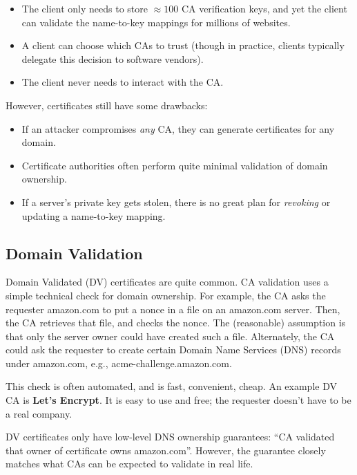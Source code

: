 \documentclass[
  letterpaper,
]{scrbook}
\providecommand{\tightlist}{%
  \setlength{\itemsep}{0pt}\setlength{\parskip}{0pt}}
\theoremstyle{definition}
\theoremstyle{plain}
\theoremstyle{plain}
\theoremstyle{remark}
\begin{document}
\begin{itemize}
\tightlist
\item
  The client only needs to store \(\approx 100\) CA verification keys,
  and yet the client can validate the name-to-key mappings for millions
  of websites.
\item
  A client can choose which CAs to trust (though in practice, clients
  typically delegate this decision to software vendors).
\item
  The client never needs to interact with the CA.
\end{itemize}

However, certificates still have some drawbacks:

\begin{itemize}
\tightlist
\item
  If an attacker compromises \emph{any} CA, they can generate
  certificates for any domain.
\item
  Certificate authorities often perform quite minimal validation of
  domain ownership.
\item
  If a server's private key gets stolen, there is no great plan for
  \emph{revoking} or updating a name-to-key mapping.
\end{itemize}

\subsection{Domain Validation}\label{domain-validation}

Domain Validated (DV) certificates are quite common. CA validation uses
a simple technical check for domain ownership. For example, the CA asks
the requester amazon.com to put a nonce in a file on an amazon.com
server. Then, the CA retrieves that file, and checks the nonce. The
(reasonable) assumption is that only the server owner could have created
such a file. Alternately, the CA could ask the requester to create
certain Domain Name Services (DNS) records under amazon.com, e.g.,
acme-challenge.amazon.com.

This check is often automated, and is fast, convenient, cheap. An
example DV CA is \textbf{Let's Encrypt}. It is easy to use and free; the
requester doesn't have to be a real company.

DV certificates only have low-level DNS ownership guarantees: ``CA
validated that owner of certificate owns amazon.com''. However, the
guarantee closely matches what CAs can be expected to validate in real
life.
\end{document}
